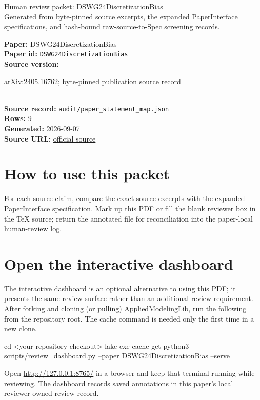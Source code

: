 \documentclass[10pt]{article}
\begin{document}
\fontsize{9}{10}\selectfont

\begin{center}
{\LARGE Human review packet: DSWG24DiscretizationBias}\\[0.35em]
\small Generated from byte-pinned source excerpts, the expanded PaperInterface
specifications, and hash-bound raw-source-to-Spec screening records.
\end{center}

\noindent\textbf{Paper:} DSWG24DiscretizationBias\\
\textbf{Paper id:} \texttt{DSWG24DiscretizationBias}\\
\textbf{Source version:} \parbox[t]{0.76\linewidth}{\raggedright arXiv:2405.16762; byte-pinned publication source record}\\
\textbf{Source record:} \texttt{audit/paper\_statement\_map.json}\\
\textbf{Rows:} 9\\
\textbf{Generated:} 2026-09-07\\
\textbf{Source URL:} \href{https://arxiv.org/pdf/2405.16762}{official source}





\section*{How to use this packet}
For each source claim, compare the exact source excerpts with the expanded
PaperInterface specification. Mark up this PDF or fill the blank reviewer box in the TeX source;
return the annotated file for reconciliation into the paper-local human-review
log.

\section*{Open the interactive dashboard}
The interactive dashboard is an optional alternative to using this PDF; it
presents the same review surface rather than an additional review requirement.
After forking and cloning (or pulling) AppliedModelingLib, run the following from the
repository root. The cache command is needed only the first time in a new clone.
\begin{ReviewVerbatim}
cd <your-repository-checkout>
lake exe cache get
python3 scripts/review_dashboard.py --paper DSWG24DiscretizationBias --serve
\end{ReviewVerbatim}
Open \url{http://127.0.0.1:8765/} in a browser and keep that terminal running
while reviewing. The dashboard records saved annotations in this paper's local
reviewer-owned review record.
\end{document}
